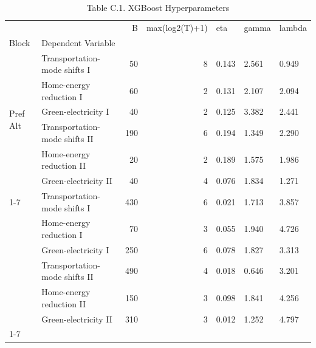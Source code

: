 \begin{table}
\caption{Table C.1. XGBoost Hyperparameters}
\begin{tabular}{llrrlll}
\toprule
 &  & B & max(log2(T)+1) & eta & gamma & lambda \\
Block & Dependent Variable &  &  &  &  &  \\
\midrule
\multirow[t]{6}{*}{Pref Alt} & Transportation-mode shifts I & 50 & 8 & 0.143 & 2.561 & 0.949 \\
 & Home-energy reduction I & 60 & 2 & 0.131 & 2.107 & 2.094 \\
 & Green-electricity I & 40 & 2 & 0.125 & 3.382 & 2.441 \\
 & Transportation-mode shifts II & 190 & 6 & 0.194 & 1.349 & 2.290 \\
 & Home-energy reduction II & 20 & 2 & 0.189 & 1.575 & 1.986 \\
 & Green-electricity II & 40 & 4 & 0.076 & 1.834 & 1.271 \\
\cline{1-7}
\multirow[t]{6}{*}{WTA} & Transportation-mode shifts I & 430 & 6 & 0.021 & 1.713 & 3.857 \\
 & Home-energy reduction I & 70 & 3 & 0.055 & 1.940 & 4.726 \\
 & Green-electricity I & 250 & 6 & 0.078 & 1.827 & 3.313 \\
 & Transportation-mode shifts II & 490 & 4 & 0.018 & 0.646 & 3.201 \\
 & Home-energy reduction II & 150 & 3 & 0.098 & 1.841 & 4.256 \\
 & Green-electricity II & 310 & 3 & 0.012 & 1.252 & 4.797 \\
\cline{1-7}
\bottomrule
\end{tabular}
\end{table}

